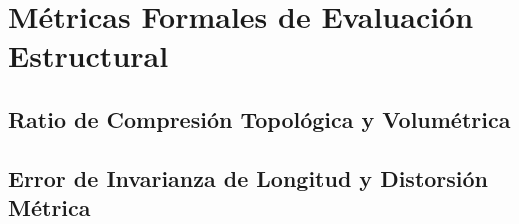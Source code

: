 \section{Métricas Formales de Evaluación Estructural}

\subsection{Ratio de Compresión Topológica y Volumétrica}
%

\subsection{Error de Invarianza de Longitud y Distorsión Métrica}
%
